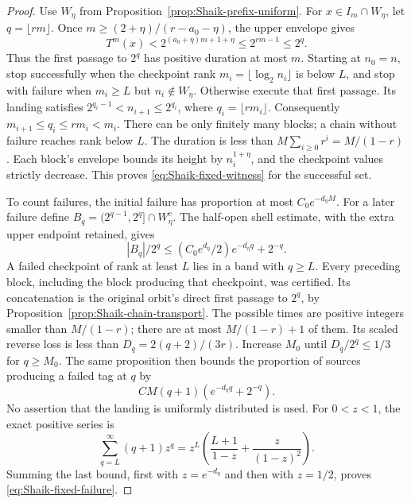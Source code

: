 \begin{proof}
Use \(W_\eta\) from Proposition~\ref{prop:Shaik-prefix-uniform}.
For \(x\in I_m\cap W_\eta\), let \(q=\lfloor rm\rfloor\).
Once \(m\ge(2+\eta)/(r-a_0-\eta)\), the upper envelope gives
\[
 T^m(x)<2^{(a_0+\eta)m+1+\eta}\le2^{rm-1}\le2^q.
\]
Thus the first passage to \(2^q\) has positive duration at most \(m\).
Starting at \(n_0=n\), stop successfully when the checkpoint rank
\(m_i=\lfloor\log_2n_i\rfloor\) is below \(L\), and stop with failure
when \(m_i\ge L\) but \(n_i\notin W_\eta\). Otherwise execute that
first passage. Its landing satisfies
\(2^{q_i-1}<n_{i+1}\le2^{q_i}\), where \(q_i=\lfloor rm_i\rfloor\).
Consequently \(m_{i+1}\le q_i\le rm_i<m_i\).
There can be only finitely many blocks; a chain without failure reaches
rank below \(L\). The duration is less than
\(M\sum_{i\ge0}r^i=M/(1-r)\).
Each block's envelope bounds its height by \(n_i^{1+\eta}\),
and the checkpoint values strictly decrease. This proves
\eqref{eq:Shaik-fixed-witness} for the successful set.

To count failures, the initial failure has proportion
at most \(C_0e^{-d_\eta M}\).
For a later failure define
\(B_q=(2^{q-1},2^q]\cap W_\eta^c\).
The half-open shell estimate, with the extra upper endpoint retained, gives
\[
 |B_q|/2^q\le (C_0e^{d_\eta}/2)e^{-d_\eta q}+2^{-q}.
\]
A failed checkpoint of rank at least \(L\) lies in a band with \(q\ge L\).
Every preceding block, including the block producing that checkpoint,
was certified. Its concatenation is the original orbit's direct first
passage to \(2^q\), by Proposition~\ref{prop:Shaik-chain-transport}.
The possible times are positive integers smaller than \(M/(1-r)\);
there are at most \(M/(1-r)+1\) of them. Its scaled reverse loss is
less than \(D_q=2(q+2)/(3r)\).
Increase \(M_0\) until \(D_q/2^q\le1/3\) for \(q\ge M_0\).
The same proposition then bounds the proportion of sources producing
a failed tag at \(q\) by
\[
 C M(q+1)(e^{-d_\eta q}+2^{-q}).
\]
No assertion that the landing is uniformly distributed is used.
For \(0<z<1\), the exact positive series is
\[
 \sum_{q=L}^{\infty}(q+1)z^q
 =z^L\left(\frac{L+1}{1-z}+\frac{z}{(1-z)^2}\right).
\]
Summing the last bound, first with \(z=e^{-d_\eta}\) and then with
\(z=1/2\), proves \eqref{eq:Shaik-fixed-failure}.


\end{proof}
